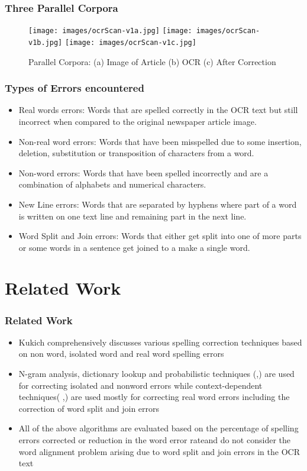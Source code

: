 \documentclass{beamer}
\begin{document}
\begin{frame}
\frametitle{Three Parallel Corpora }
\begin{figure}[ht]
\begin{center}
\texttt{[image: images/ocrScan-v1a.jpg]}
\texttt{[image: images/ocrScan-v1b.jpg]}
\texttt{[image: images/ocrScan-v1c.jpg]}
\caption{Parallel Corpora: (a) Image of Article (b) OCR (c) After Correction}
\end{center}
\end{figure}
\end{frame}

\begin{frame}
\frametitle{Types of Errors encountered }
\begin{itemize}
\item Real words errors: Words that are spelled correctly in the OCR text but still incorrect
when compared to the original newspaper article image.
\item Non-real word errors: Words that have been misspelled due to some insertion, deletion,
substitution or transposition of characters from a word.
\item Non-word errors: Words that have been spelled incorrectly and are a combination of
alphabets and numerical characters.
\item New Line errors: Words that are separated by hyphens where part of a word is written
on one text line and remaining part in the next line. 
\item Word Split and Join errors: Words that either get split into one of more parts or
some words in a sentence get joined to a make a single word.
\end{itemize}
\end{frame}

\section{Related Work}
\begin{frame}
\frametitle{Related Work}
\begin{itemize}
 \justifying

\item
Kukich \cite{kukich1992techniques} comprehensively discusses various spelling correction techniques based on non word, isolated word and
real word spelling errors
\item
N-gram analysis, dictionary lookup and probabilistic techniques (\cite{agarwal2013utilizing},\cite{chattopadhyaya2013fast}) are used
for correcting isolated and nonword errors while context-dependent techniques( \cite{elmi1998spelling},\cite{bassil2012ocr}) are used mostly for correcting real
word errors including the correction of word split and join errors

\item
All of the above algorithms are evaluated based on the percentage of spelling errors corrected or reduction in the word error rate\cite{rice1996measuring}and do not consider the word
alignment problem arising due to word split and join errors in the OCR text
\end{itemize}
\end{frame}
\end{document}

